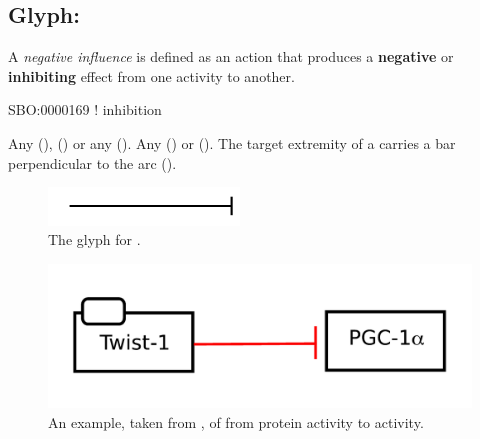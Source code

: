 \subsection{Glyph: }
\label{sec:af:negative_infl}

A \emph{negative influence} is defined as an action that produces a \textbf{negative} or \textbf{inhibiting} effect from one activity to another.

\begin{glyphDescription}

\glyphSboTerm SBO:0000169 ! inhibition

 \glyphOrigin Any  (),   () or any  ().
 \glyphTarget Any  () or  ().
 \glyphEndPoint The target extremity of a  carries a bar perpendicular to the arc ().

\end{glyphDescription}

\begin{figure}[H]
  \centering
  \includegraphics[width = 2in]{images/negativeInfluence}
  \caption{The \AF glyph for .}
  \label{fig:af:negativeInfl}
\end{figure}

\begin{figure}[H]
  \centering
  \includegraphics[width = 5in]{examples/ex-negativeInfluence}
  \caption{An example, taken from , of  from  protein activity to  activity.}
  \label{fig:af:ex-NI}
\end{figure} 